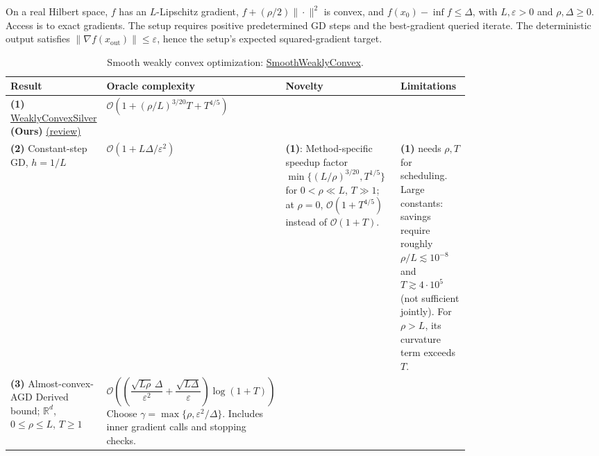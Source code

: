 \begin{table}[tp]
\centering
\caption{Smooth weakly convex optimization: \href{https://github.com/k3nfalt/longtails/blob/main/LongTails/Setups/SmoothWeaklyConvex.lean}{SmoothWeaklyConvex}.}\label{tab:SmoothWeaklyConvex}
\parbox{\linewidth}{\footnotesize On a real Hilbert space, $f$ has an $L$-Lipschitz gradient, $f+(\rho/2)\|\cdot\|^2$ is convex, and $f(x_0)-\inf f\leq\Delta$, with $L,\varepsilon>0$ and $\rho,\Delta\geq0$. Access is to exact gradients. The setup requires positive predetermined GD steps and the best-gradient queried iterate. The deterministic output satisfies $\|\nabla f(x_{\mathrm{out}})\|\leq\varepsilon$, hence the setup's expected squared-gradient target.}\par\smallskip
\begin{threeparttable}
\footnotesize
\setlength{\tabcolsep}{4pt}\renewcommand{\arraystretch}{1.25}
\begin{tabularx}{\linewidth}{@{}>{\raggedright\arraybackslash}p{0.20\linewidth}>{\raggedright\arraybackslash}p{0.32\linewidth}>{\raggedright\arraybackslash}p{0.25\linewidth}>{\raggedright\arraybackslash}X@{}}
\toprule
\textbf{Result} & \textbf{Oracle complexity} & \textbf{Novelty} & \textbf{Limitations} \\
\midrule
\textbf{(1)} \href{https://github.com/k3nfalt/longtails/blob/main/LongTails/Theorems/WeaklyConvexSilver.lean}{Weakly\allowbreak Convex\allowbreak Silver} \textbf{(Ours)} \href{https://github.com/k3nfalt/longtails/blob/main/scripts/reviews/WeaklyConvexSilver.md}{(review)}
& $\mathcal{O}\!\left(1+(\rho/L)^{3/20}T+T^{4/5}\right)$
& & \\
\midrule[1.2pt]
\textbf{(2)} Constant-step GD, $h=1/L$ \citep[Eq.~(12)]{swcRotaru2026v2}
& $\mathcal{O}(1+L\Delta/\varepsilon^2)$
& \textbf{(1)}: Method-specific speedup factor $\min\{(L/\rho)^{3/20},T^{1/5}\}$ for $0<\rho\ll L$, $T\gg1$; at $\rho=0$, $\mathcal{O}(1+T^{4/5})$ instead of $\mathcal{O}(1+T)$.
& \textbf{(1)} needs $\rho,T$ for scheduling. Large constants: savings require roughly $\rho/L\lesssim10^{-8}$ and $T\gtrsim4\cdot10^5$ (not sufficient jointly). For $\rho>L$, its curvature term exceeds $T$. \\
\midrule
\textbf{(3)} Almost-convex-AGD \citep[Lemma~3.1]{swcCarmon2017v2}\newline Derived bound; $\mathbb{R}^d$, $0\leq\rho\leq L$, $T\geq1$
& $\mathcal{O}\!\left(\left(\dfrac{\sqrt{L\rho}\,\Delta}{\varepsilon^2}+\dfrac{\sqrt{L\Delta}}{\varepsilon}\right)\log(1+T)\right)$\newline Choose $\gamma=\max\{\rho,\varepsilon^2/\Delta\}$. Includes inner gradient calls and stopping checks.

\end{tabularx}
\end{threeparttable}
\end{table}
